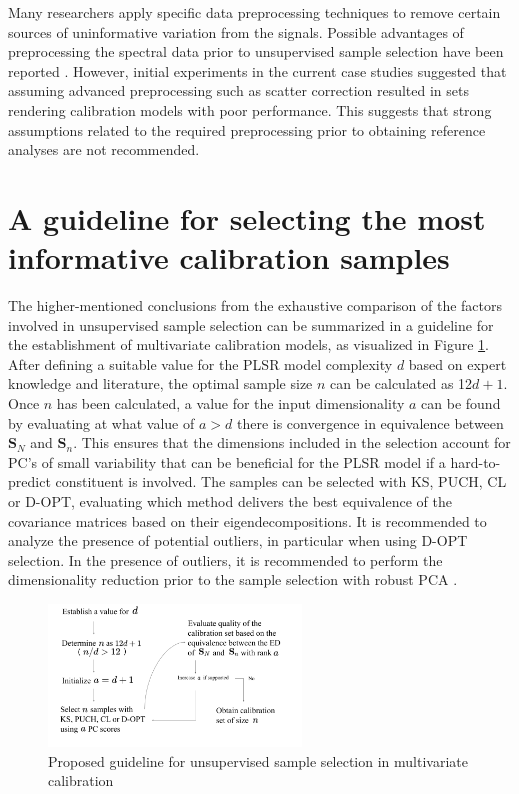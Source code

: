 \documentclass[journal=ancham,manuscript=article]{achemso}
\begin{document}
Many researchers apply specific data preprocessing techniques to remove certain sources of uninformative variation from the signals. Possible advantages of preprocessing the spectral data prior to unsupervised sample selection have been reported \cite{Liu2019}.
However, initial experiments in the current case studies suggested that assuming advanced preprocessing such as scatter correction resulted in sets rendering calibration models with poor performance. This suggests that strong assumptions related to the required preprocessing prior to obtaining reference analyses are not recommended.


\section*{A guideline for selecting the most informative calibration samples}\label{scheme}

The higher-mentioned conclusions from the exhaustive comparison of the factors involved in unsupervised sample selection can be summarized in a guideline for the establishment of multivariate calibration models, as visualized in Figure \ref{fig_scheme}. After defining a suitable value for the PLSR model complexity $d$ based on expert knowledge and literature, the optimal sample size $n$ can be calculated as 12$d+1$. Once $n$ has been calculated, a value for the input dimensionality $a$ can be found by evaluating at what value of $a>d$ there is convergence in equivalence between $\mathbf{S}_N$ and $\mathbf{S}_n$. This ensures that the dimensions included in the selection account for PC's of small variability that can be beneficial for the PLSR model if a hard-to-predict constituent is involved. The samples can be selected with KS, PUCH, CL or D-OPT, evaluating which method delivers the best equivalence of the covariance matrices based on their eigendecompositions. It is recommended to analyze the presence of potential outliers, in particular when using D-OPT selection. In the presence of outliers, it is recommended to perform the dimensionality reduction prior to the sample selection with robust PCA \cite{Hubert2005}.


\begin{figure}[b]
\includegraphics[width=0.6\textwidth]{manuscript/figures/scheme.png}
\centering
\caption{Proposed guideline for unsupervised sample selection in multivariate calibration}
\label{fig_scheme}
\end{figure}
\end{document}
